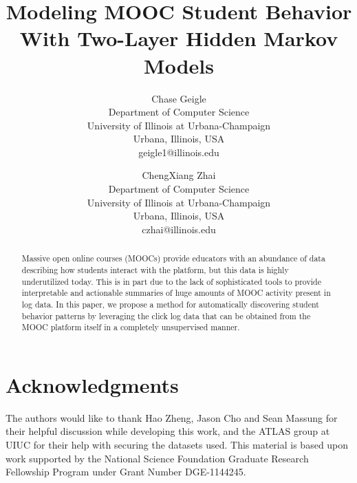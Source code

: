 \documentclass[a4,notitlepage,12pt]{jedm}
\begin{document}
\title{Modeling MOOC Student Behavior With Two-Layer Hidden Markov Models}

\author{%
  {\large Chase Geigle}\\Department of Computer Science\\University
  of Illinois at Urbana-Champaign\\Urbana, Illinois,
  USA\\geigle1@illinois.edu
  \and
  {\large ChengXiang Zhai}\\Department of Computer Science\\University of
  Illinois at Urbana-Champaign\\Urbana, Illinois, USA\\czhai@illinois.edu}

\maketitle

\begin{abstract}
  Massive open online courses (MOOCs) provide educators with an abundance
  of data describing how students interact with the platform, but this data
  is highly underutilized today. This is in part due to the lack of
  sophisticated tools to provide interpretable and actionable summaries of
  huge amounts of MOOC activity present in log data. In this paper, we
  propose a method for automatically discovering student behavior patterns
  by leveraging the click log data that can be obtained from the MOOC
  platform itself in a completely unsupervised manner.
\end{abstract}

\newcommand{\NSFGRFP}{This material is based upon work supported by the
National Science Foundation Graduate Research Fellowship Program under
Grant Number DGE-1144245.}

\newcommand{\acknowledgments}{The authors would like to thank Hao Zheng,
Jason Cho and Sean Massung for their helpful discussion while developing
this work, and the ATLAS group at UIUC for their help with securing the
datasets used. \NSFGRFP{}}











\section{Acknowledgments}
\acknowledgments{}



\end{document}
